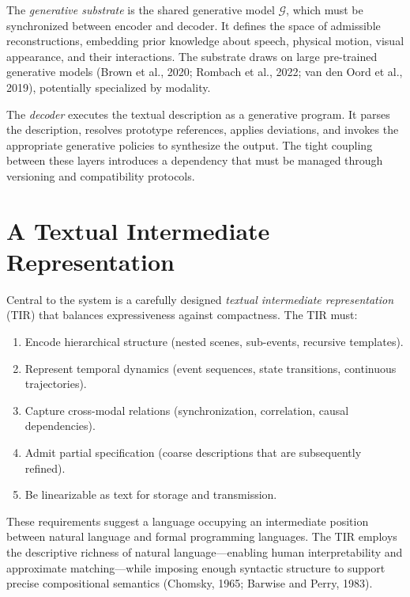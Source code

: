 \documentclass[11pt,a4paper]{article}
\theoremstyle{definition}
\theoremstyle{remark}
\begin{document}
The \emph{generative substrate} is the shared generative model $\mathcal{G}$, which must be synchronized between encoder and decoder. It defines the space of admissible reconstructions, embedding prior knowledge about speech, physical motion, visual appearance, and their interactions. The substrate draws on large pre-trained generative models (Brown et al., 2020; Rombach et al., 2022; van den Oord et al., 2019), potentially specialized by modality.

The \emph{decoder} executes the textual description as a generative program. It parses the description, resolves prototype references, applies deviations, and invokes the appropriate generative policies to synthesize the output. The tight coupling between these layers introduces a dependency that must be managed through versioning and compatibility protocols.

\section{A Textual Intermediate Representation}
\label{sec:TIR}

Central to the system is a carefully designed \emph{textual intermediate representation} (TIR) that balances expressiveness against compactness. The TIR must:

\begin{enumerate}[noitemsep]
\item Encode hierarchical structure (nested scenes, sub-events, recursive templates).
\item Represent temporal dynamics (event sequences, state transitions, continuous trajectories).
\item Capture cross-modal relations (synchronization, correlation, causal dependencies).
\item Admit partial specification (coarse descriptions that are subsequently refined).
\item Be linearizable as text for storage and transmission.
\end{enumerate}

These requirements suggest a language occupying an intermediate position between natural language and formal programming languages. The TIR employs the descriptive richness of natural language---enabling human interpretability and approximate matching---while imposing enough syntactic structure to support precise compositional semantics (Chomsky, 1965; Barwise and Perry, 1983).
\end{document}
